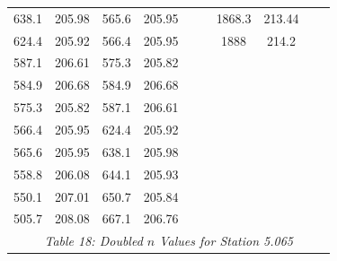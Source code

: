 \begin{center}
\begin{tabular}{|cccc||cccc||cc|}
    638.1    & 205.98                  & 565.6 & 205.95                       &       &                                    & 1868.3 & 213.44                                &          &                                    \\
    624.4    & 205.92                  & 566.4 & 205.95                       &       &                                    & 1888   & 214.2                                 &          &                                    \\
    587.1    & 206.61                  & 575.3 & 205.82                       &       &                                    &        &                                       &          &                                    \\
    584.9    & 206.68                  & 584.9 & 206.68                       &       &                                    &        &                                       &          &                                    \\
    575.3    & 205.82                  & 587.1 & 206.61                       &       &                                    &        &                                       &          &                                    \\
    566.4    & 205.95                  & 624.4 & 205.92                       &       &                                    &        &                                       &          &                                    \\
    565.6    & 205.95                  & 638.1 & 205.98                       &       &                                    &        &                                       &          &                                    \\
    558.8    & 206.08                  & 644.1 & 205.93                       &       &                                    &        &                                       &          &                                    \\
    550.1    & 207.01                  & 650.7 & 205.84                       &       &                                    &        &                                       &          &                                    \\
    505.7    & 208.08                  & 667.1 & 206.76                       &       &                                    &        &                                       &          &                                    \\
    \hline\multicolumn{10}{c}{\emph{Table 18: Doubled $n$ Values for Station 5.065}}
\end{tabular}


\end{center}
